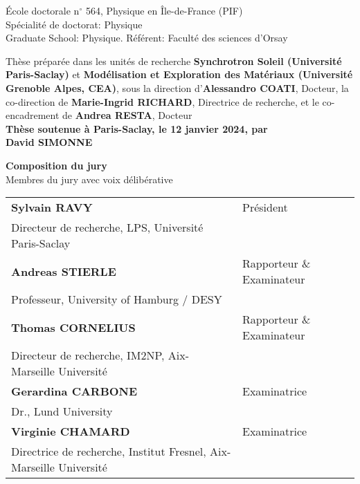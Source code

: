 \begin{titlepage}
École doctorale n$^{\circ}$ 564, Physique en Île-de-France (PIF)\\
\small Spécialité de doctorat: Physique\\
\small Graduate School: Physique. Référent: Faculté des sciences d’Orsay\\
\vspace{6mm}

\footnotesize Thèse préparée dans les unités de recherche \textbf{Synchrotron Soleil (Université Paris-Saclay)} et \textbf{Modélisation et Exploration des Matériaux (Université Grenoble Alpes, CEA)}, sous la direction d'\textbf{Alessandro COATI}, Docteur, la co-direction de \textbf{Marie-Ingrid RICHARD}, Directrice de recherche, et le co-encadrement de \textbf{Andrea RESTA}, Docteur\\
\vspace{15mm}
\textbf{Thèse soutenue à Paris-Saclay, le 12 janvier 2024, par}\\
\bigskip
\Large {\color{Prune} \textbf{David SIMONNE}}

\vspace{\fill} %

\bigskip
\flushleft
\small {\color{Prune} \textbf{Composition du jury}}\\
{\color{Prune} \scriptsize {Membres du jury avec voix délibérative}} \\
\vspace{2mm}
\scriptsize
\begin{tabular}{|p{10cm}l}
\arrayrulecolor{Prune}
\textbf{Sylvain RAVY} & Président \\
Directeur de recherche, LPS, Université Paris-Saclay & \\
\textbf{Andreas STIERLE} & Rapporteur \& Examinateur \\
Professeur, University of Hamburg / DESY & \\
\textbf{Thomas CORNELIUS} & Rapporteur \& Examinateur \\
Directeur de recherche, IM2NP, Aix-Marseille Université & \\
\textbf{Gerardina CARBONE} & Examinatrice \\
Dr., Lund University & \\
\textbf{Virginie CHAMARD} & Examinatrice \\
Directrice de recherche, Institut Fresnel, Aix-Marseille Université & \\
\end{tabular}
\vspace{6mm}

\end{titlepage}